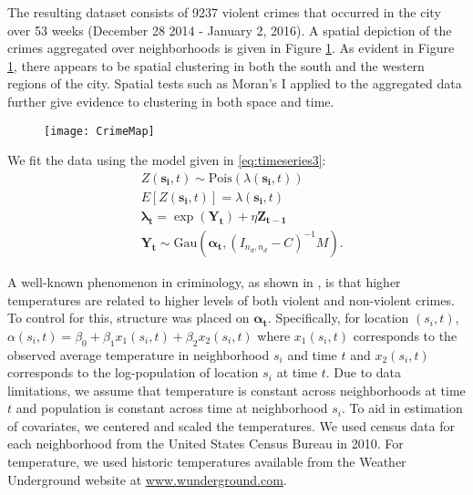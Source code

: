 \documentclass[11pt]{isuthesis}
\begin{document}
	The resulting dataset consists of 9237 violent crimes that occurred in the city over 53 weeks (December 28 2014 - January 2, 2016).  A spatial depiction of the crimes aggregated over neighborhoods is given in Figure \ref{fig:SpatialOnly}.  	As evident in Figure \ref{fig:SpatialOnly}, there appears to be spatial clustering in both the south and the western regions of the city.  Spatial tests such as Moran's I applied to the aggregated data further give evidence to clustering in both space and time. 
	
	
	\begin{figure}[!htp]
		\centering
		\texttt{[image: CrimeMap]}
		\label{fig:SpatialOnly}
	\end{figure}

	We fit the data using the model given in  \eqref{eq:timeseries3}:
	\begin{align}
	& Z(\boldsymbol{s_i},t) \sim \mbox{Pois}(\lambda(\boldsymbol{s_i},t)) \label{eq:timeseries3} \\
	& E[Z(\boldsymbol{s_i},t)]=\lambda(\boldsymbol{s_i},t)\\
	& \boldsymbol{\lambda_t} = \exp(\boldsymbol{Y_t})+\eta \boldsymbol{Z_{t-1}}\\
	& \boldsymbol{Y_t} \sim \mbox{Gau} (\boldsymbol{\alpha_t},(I_{{n_d},{n_d}}-C)^{-1}M).
	\end{align}
	
	A well-known phenomenon in criminology, as shown in \cite{anderson1987temperature}, is that higher temperatures are related to higher levels of both violent and non-violent crimes.  To control for this, structure was placed on $\boldsymbol{\alpha_t}$.  Specifically, for location $(s_i,t)$, $\alpha(s_i,t)=\beta_0 + \beta_1 x_1(s_i,t) + \beta_2 x_2(s_i,t)$ where $x_1(s_i,t)$ corresponds to the observed average temperature in neighborhood $s_i$ and time $t$ and $x_2(s_i,t)$ corresponds to the log-population of location $s_i$ at time $t$.  Due to data limitations, we assume that temperature is constant across neighborhoods at time $t$ and population is constant across time at neighborhood $s_i$.  To aid in estimation of covariates, we centered and scaled the temperatures. We used census data for each neighborhood from the United States Census Bureau in 2010.  For temperature, we used historic temperatures available from the Weather Underground website at \url{www.wunderground.com}.
	
\end{document}
